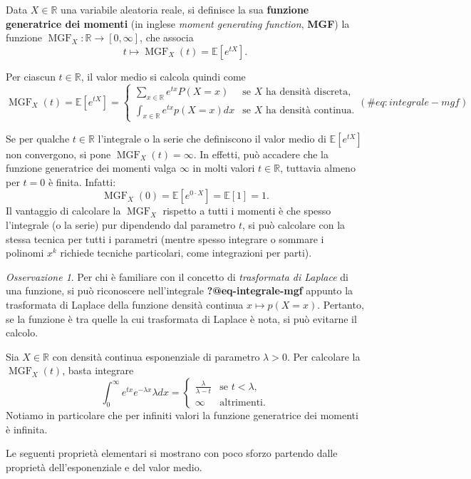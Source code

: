 \documentclass[
  italian,
  letterpaper,
]{book}
\newcommand{\sqa}[1]{\left[ #1 \right]}
\newcommand{\R}{\mathbb{R}}
\newcommand{\E}[1]{\mathbb{E}\sqa{#1}}
\theoremstyle{definition}
\theoremstyle{remark}
\newtheorem*{remark}{Osservazione}
\begin{document}
Data \(X \in \R\) una variabile aleatoria reale, si definisce la sua
\textbf{funzione generatrice dei momenti} (in inglese \emph{moment
generating function}, \textbf{MGF}) la funzione
\(\operatorname{MGF}_X:  \R \to [0, \infty]\), che associa
\[ t \mapsto \operatorname{MGF}_X(t) = \E{ e^{tX}}.\]

Per ciascun \(t \in \R\), il valor medio si calcola quindi come
\[ \operatorname{MGF}_X(t) = \E{e^{tX}} = \begin{cases} \sum_{x \in \R} e^{tx} P(X=x) & \text{se $X$ ha densità discreta,}\\
\int_{x \in \R} e^{tx} p(X=x)dx & \text{se $X$ ha densità continua.}
\end{cases}
(\#eq:integrale-mgf)\]

Se per qualche \(t \in \R\) l'integrale o la serie che definiscono il
valor medio di \(\E{e^{tX}}\) non convergono, si pone
\(\operatorname{MGF}_X(t) =\infty\). In effetti, può accadere che la
funzione generatrice dei momenti valga \(\infty\) in molti valori
\(t \in \R\), tuttavia almeno per \(t =0\) è finita. Infatti:
\[ \operatorname{MGF}_X(0) = \E{ e^{0 \cdot X}} = \E{1} = 1.\] Il
vantaggio di calcolare la \(\operatorname{MGF}_X\) rispetto a tutti i
momenti è che spesso l'integrale (o la serie) pur dipendendo dal
parametro \(t\), si può calcolare con la stessa tecnica per tutti i
parametri (mentre spesso integrare o sommare i polinomi \(x^k\) richiede
tecniche particolari, come integrazioni per parti).

\begin{remark}
Per chi è familiare con il concetto di \emph{trasformata di Laplace} di
una funzione, si può riconoscere nell'integrale
\textbf{?@eq-integrale-mgf} appunto la trasformata di Laplace della
funzione densità continua \(x \mapsto p(X=x)\). Pertanto, se la funzione
è tra quelle la cui trasformata di Laplace è nota, si può evitarne il
calcolo.
\end{remark}

Sia \(X\in \R\) con densità continua esponenziale di parametro
\(\lambda>0\). Per calcolare la \(\operatorname{MGF}_X(t)\), basta
integrare
\[ \int_0^\infty e^{tx} e^{-\lambda x} \lambda dx = \begin{cases} \frac{\lambda}{\lambda-t} & \text{se $t<\lambda$,}\\
\infty & \text{altrimenti.}\end{cases}\] Notiamo in particolare che per
infiniti valori la funzione generatrice dei momenti è infinita.

Le seguenti proprietà elementari si mostrano con poco sforzo partendo
dalle proprietà dell'esponenziale e del valor medio.
\end{document}
